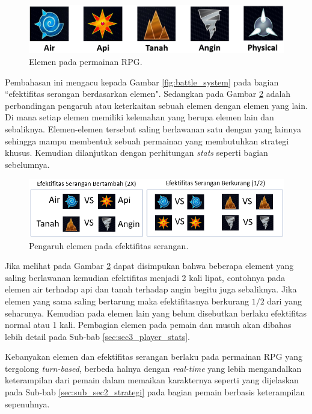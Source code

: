 \begin{subs}
\begin{enumerate}[label=\textbf{\arabic*).}]
		\begin{figure} [!h] \centering
			\includegraphics[scale=0.40]{img/element.png}
			\caption{Elemen pada permainan RPG.}
			\label{fig:elemen}
		\end{figure}
		
		Pembahasan ini mengacu kepada Gambar \ref{fig:battle_system} pada bagian ``efektifitas serangan berdasarkan elemen". Sedangkan pada Gambar \ref{fig:efektifitas} adalah perbandingan pengaruh atau keterkaitan sebuah elemen dengan elemen yang lain. Di mana setiap elemen memiliki kelemahan yang berupa elemen lain dan sebaliknya. Elemen-elemen tersebut saling berlawanan satu dengan yang lainnya sehingga mampu membentuk sebuah permainan yang membutuhkan strategi khusus. Kemudian dilanjutkan dengan perhitungan \textit{stats} seperti bagian sebelumnya.
		\vspace{1ex}
		
		\begin{figure} [!h] \centering
			\includegraphics[scale=0.62]{img/efektifitas.png}
			\caption{Pengaruh elemen pada efektifitas serangan.}
			\label{fig:efektifitas}
		\end{figure}
		
		Jika melihat pada Gambar \ref{fig:efektifitas} dapat disimpukan bahwa beberapa element yang saling berlawanan kemudian efektifitas menjadi 2 kali lipat, contohnya pada elemen air terhadap api dan tanah terhadap angin begitu juga sebaliknya. Jika elemen yang sama saling bertarung maka efektifitasnya berkurang $1/2$ dari yang seharunya. Kemudian pada elemen lain yang belum disebutkan berlaku efektifitas normal atau 1 kali. Pembagian elemen pada pemain dan musuh akan dibahas lebih detail pada Sub-bab \ref{sec:sec3_player_stats}.
		\vspace{1ex}
		
		Kebanyakan elemen dan efektifitas serangan berlaku pada permainan RPG yang tergolong \textit{turn-based}, berbeda halnya dengan \textit{real-time} yang lebih mengandalkan keterampilan dari pemain dalam memaikan karakternya seperti yang dijelaskan pada Sub-bab \ref{sec:sub_sec2_strategi} pada bagian pemain berbasis keterampilan sepenuhnya.
		\vspace{1ex}
		

\end{enumerate}
\end{subs}
